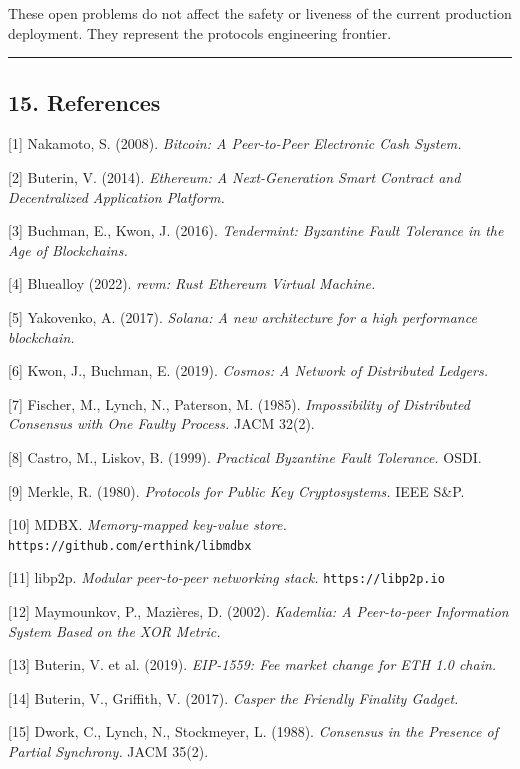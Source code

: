 \documentclass[11pt,a4paper]{article}
\begin{document}
These open problems do not affect the safety or liveness of the current
production deployment. They represent the protocol\textquotesingle s
engineering frontier.

\begin{center}\rule{0.5\linewidth}{0.5pt}\end{center}

\hypertarget{15-references}{%
\subsection{15. References}\label{15-references}}

{[}1{]} Nakamoto, S. (2008). \emph{Bitcoin: A Peer-to-Peer Electronic
Cash System.}

{[}2{]} Buterin, V. (2014). \emph{Ethereum: A Next-Generation Smart
Contract and Decentralized Application Platform.}

{[}3{]} Buchman, E., Kwon, J. (2016). \emph{Tendermint: Byzantine Fault
Tolerance in the Age of Blockchains.}

{[}4{]} Bluealloy (2022). \emph{revm: Rust Ethereum Virtual Machine.}

{[}5{]} Yakovenko, A. (2017). \emph{Solana: A new architecture for a
high performance blockchain.}

{[}6{]} Kwon, J., Buchman, E. (2019). \emph{Cosmos: A Network of
Distributed Ledgers.}

{[}7{]} Fischer, M., Lynch, N., Paterson, M. (1985). \emph{Impossibility
of Distributed Consensus with One Faulty Process.} JACM 32(2).

{[}8{]} Castro, M., Liskov, B. (1999). \emph{Practical Byzantine Fault
Tolerance.} OSDI.

{[}9{]} Merkle, R. (1980). \emph{Protocols for Public Key
Cryptosystems.} IEEE S\&P.

{[}10{]} MDBX. \emph{Memory-mapped key-value store.}
\texttt{https://github.com/erthink/libmdbx}

{[}11{]} libp2p. \emph{Modular peer-to-peer networking stack.}
\texttt{https://libp2p.io}

{[}12{]} Maymounkov, P., Mazières, D. (2002). \emph{Kademlia: A
Peer-to-peer Information System Based on the XOR Metric.}

{[}13{]} Buterin, V. et al. (2019). \emph{EIP-1559: Fee market change
for ETH 1.0 chain.}

{[}14{]} Buterin, V., Griffith, V. (2017). \emph{Casper the Friendly
Finality Gadget.}

{[}15{]} Dwork, C., Lynch, N., Stockmeyer, L. (1988). \emph{Consensus in
the Presence of Partial Synchrony.} JACM 35(2).
\end{document}
